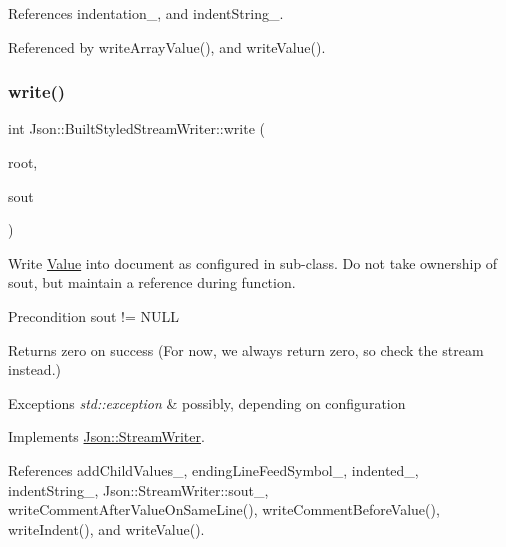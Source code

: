 References indentation\+\_\+, and indent\+String\+\_\+.



Referenced by write\+Array\+Value(), and write\+Value().

\mbox{\label{structJson_1_1BuiltStyledStreamWriter_a823cdb1afabb6b0d5f39bcd5a6a6f747_a823cdb1afabb6b0d5f39bcd5a6a6f747}} 
\subsubsection{\texorpdfstring{write()}{write()}}
{\footnotesize\ttfamily int Json\+::\+Built\+Styled\+Stream\+Writer\+::write (\begin{DoxyParamCaption}\item[{\hyperlink{classJson_1_1Value}{Value} const \&}]{root,  }\item[{\hyperlink{json_8h_a37a25be5fca174927780caeb280094ce_a37a25be5fca174927780caeb280094ce}{J\+S\+O\+N\+C\+P\+P\+\_\+\+O\+S\+T\+R\+E\+AM} $\ast$}]{sout }\end{DoxyParamCaption})\hspace{0.3cm}{\ttfamily [virtual]}}

Write \hyperlink{classJson_1_1Value}{Value} into document as configured in sub-\/class. Do not take ownership of sout, but maintain a reference during function. \begin{DoxyPrecond}{Precondition}
sout != N\+U\+LL 
\end{DoxyPrecond}
\begin{DoxyReturn}{Returns}
zero on success (For now, we always return zero, so check the stream instead.) 
\end{DoxyReturn}

\begin{DoxyExceptions}{Exceptions}
{\em std\+::exception} & possibly, depending on configuration \\
\hline
\end{DoxyExceptions}


Implements \hyperlink{classJson_1_1StreamWriter_a84278bad0c9a9fc587bc2a97c5bb5993_a84278bad0c9a9fc587bc2a97c5bb5993}{Json\+::\+Stream\+Writer}.



References add\+Child\+Values\+\_\+, ending\+Line\+Feed\+Symbol\+\_\+, indented\+\_\+, indent\+String\+\_\+, Json\+::\+Stream\+Writer\+::sout\+\_\+, write\+Comment\+After\+Value\+On\+Same\+Line(), write\+Comment\+Before\+Value(), write\+Indent(), and write\+Value().

